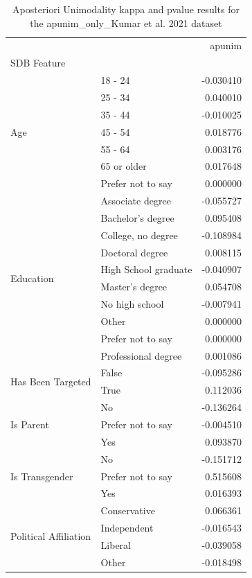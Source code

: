 \begin{table}
\caption{Aposteriori Unimodality kappa and pvalue results for the apunim_only_Kumar et al. 2021 dataset}
\label{tab:results_apunim_only_kumar}
\begin{tabular}{llr}
\toprule
 &  & apunim \\
SDB Feature &  &  \\
\midrule
\multirow[t]{7}{*}{Age} & 18 - 24 & -0.030410 \\
 & 25 - 34 & 0.040010 \\
 & 35 - 44 & -0.010025 \\
 & 45 - 54 & 0.018776 \\
 & 55 - 64 & 0.003176 \\
 & 65 or older & 0.017648 \\
 & Prefer not to say & 0.000000 \\
\cline{1-3}
\multirow[t]{10}{*}{Education} & Associate degree & -0.055727 \\
 & Bachelor's degree & 0.095408 \\
 & College, no degree & -0.108984 \\
 & Doctoral degree & 0.008115 \\
 & High School graduate & -0.040907 \\
 & Master's degree & 0.054708 \\
 & No high school & -0.007941 \\
 & Other & 0.000000 \\
 & Prefer not to say & 0.000000 \\
 & Professional degree & 0.001086 \\
\cline{1-3}
\multirow[t]{2}{*}{Has Been Targeted} & False & -0.095286 \\
 & True & 0.112036 \\
\cline{1-3}
\multirow[t]{3}{*}{Is Parent} & No & -0.136264 \\
 & Prefer not to say & -0.004510 \\
 & Yes & 0.093870 \\
\cline{1-3}
\multirow[t]{3}{*}{Is Transgender} & No & -0.151712 \\
 & Prefer not to say & 0.515608 \\
 & Yes & 0.016393 \\
\cline{1-3}
\multirow[t]{5}{*}{Political Affiliation} & Conservative & 0.066361 \\
 & Independent & -0.016543 \\
 & Liberal & -0.039058 \\
 & Other & -0.018498 \\

\end{tabular}
\end{table}
